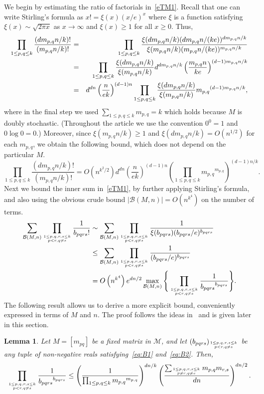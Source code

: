 \documentclass[12pt]{article}
\newcommand{\lab}[1]{\label{#1}}
\newtheorem{lemma}[thm]{Lemma}
\newcounter{step}
\def\be{\begin{equation}}
\def\ee{\end{equation}}
\newcommand{\bel}[1]{\be\lab{#1}}
\newcommand{\cB} {\ensuremath{\mathcal B}}
\newcommand{\cM} {\ensuremath{\mathcal M}}
\begin{document}
We begin by estimating the ratio of factorials in~\eqref{eTM1}.
 Recall that one can write Stirling's formula as
$x!=\xi(x)(x/e)^x$ where $\xi$ is a function satisfying 
$\xi(x)\sim \sqrt{2\pi x}$ as $x\to\infty$ and
$\xi(x)\ge1$ for all $x\ge 0$. Thus,
%
\begin{eqnarray}
\prod_{1\le p,q\le k}
\frac{(dm_{p,q}n/k)!}{(m_{p,q}n/k)!}
&=&
\prod_{1\le p,q\le k}
\frac{\xi(dm_{p,q}n/k) (dm_{p,q}n/(ke))^{dm_{p,q}n/k}}
     {\xi( m_{p,q}n/k) ( m_{p,q}n/(ke))^{ m_{p,q}n/k}}
\notag\\
&=&
\prod_{1\le p,q\le k}
\frac{\xi(dm_{p,q}n/k)}{\xi( m_{p,q}n/k)}
d^{dm_{p,q}n/k}
\left(\frac{m_{p,q}n}{ke}\right)^{(d-1)m_{p,q}n/k}
\notag\\
&=&
d^{dn}
\left(\frac{n}{ek}\right)^{(d-1)n}
\prod_{1\le p,q\le k}
\frac{\xi(dm_{p,q}n/k)}{\xi( m_{p,q}n/k)}
{m_{p,q}}^{(d-1)m_{p,q}n/k},
\label{eq:FacRat1}
\end{eqnarray}
%
where in the final step we used $\sum_{1\le p,q\le k} m_{p,q}=k$ 
which holds because $M$ is doubly stochastic. (Throughout the article we use the convention $0^0=1$ and $0\log0=0$.)
Moreover, since $\xi(m_{p,q}n/k)\ge1$ and $\xi(dm_{p,q}n/k)=O(n^{1/2})$ for each $m_{p,q}$, we obtain the following bound, which does not depend on the particular $M$.
%
\bel{eq:FacRat2}
\prod_{1\le p,q\le k}
\frac{(dm_{p,q}n/k)!}{(m_{p,q}n/k)!} =
O\left(n^{k^2/2}\right) d^{dn} \left(\frac{n}{ek}\right)^{(d-1)n}
\left(\prod_{1\le p,q\le k}
{m_{p,q}}^{m_{p,q}}\right)^{(d-1)n/k}.
\ee
%
Next we bound the inner sum in~\eqref{eTM1}, by further applying Stirling's formula, and also using the obvious crude bound $|\cB(M,n)|=O(n^{k^4})$ on the number of terms.
%
\begin{align*}
\sum_{\cB(M,n)}
\prod_{1\le p,q,r,s\le k\atop p<r,q\ne s} \frac{1}{b_{pqrs}!} 
&\sim
\sum_{\cB(M,n)}
\prod_{1\le p,q,r,s\le k\atop p<r,q\ne s} \frac{1}{\xi(b_{pqrs})(b_{pqrs}/e)^{b_{pqrs}}} 
\\
&\le
\sum_{\cB(M,n)}
\prod_{1\le p,q,r,s\le k\atop p<r,q\ne s} \frac{1}{(b_{pqrs}/e)^{b_{pqrs}}} 
\\
&=
O\left(n^{k^4}\right) e^{dn/2} \max_{\cB(M,n)}
\Bigg\{\prod_{1\le p,q,r,s\le k\atop p<r,q\ne s}\frac{1}{{b_{pqrs}}^{b_{pqrs}}}\Bigg\}.
\end{align*}
%
The following result allows us to derive a more explicit bound, conveniently expressed in terms of $M$ and $n$. The proof follows the ideas in~\cite{AM} and is given later in this section.
%
\begin{lemma}\label{lem:regtognm}
Let $M=[m_{pq}]$ be a fixed matrix in $\cM$, and let $(b_{pqrs})_{1\le p,q,r,s\le k\atop p<r,q\ne s}$ be any tuple of non-negative reals satisfying~\eqref{eq:B1} and~\eqref{eq:B2}. Then,
\[
\prod_{1\le p,q,r,s\le k\atop p<r,q\ne s}
\frac{1}{{b_{pqrs}}^{b_{pqrs}}} \le
\left(\frac{1}{\prod_{1\le p,q\le k} {m_{p,q}}^{m_{p,q}}}\right)^{dn/k} \left(\frac{\sum_{1\le p,q,r,s\le k\atop p\ne r,q\ne s} m_{p,q}m_{r,s}}{dn}\right)^{dn/2}.
\]
\end{lemma}
\end{document}
